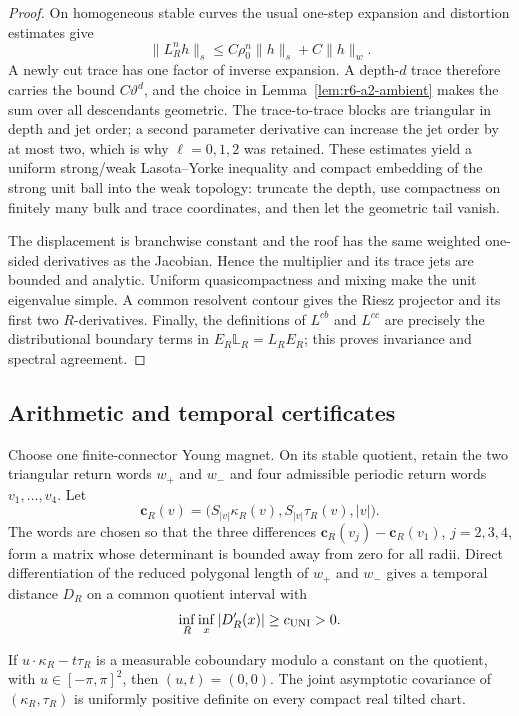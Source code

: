\begin{proof}
On homogeneous stable curves the usual one-step expansion and distortion
estimates give
\[
\|L_R^nh\|_s\le C\rho_0^n\|h\|_s+C\|h\|_w.
\]
A newly cut trace has one factor of inverse expansion.  A depth-\(d\) trace
therefore carries the bound \(C\vartheta^d\), and the choice in
Lemma~\ref{lem:r6-a2-ambient} makes the sum over all descendants geometric.
The trace-to-trace blocks are triangular in depth and jet order; a second
parameter derivative can increase the jet order by at most two, which is why
\(\ell=0,1,2\) was retained.  These estimates yield a uniform strong/weak
Lasota--Yorke inequality and compact embedding of the strong unit ball into
the weak topology: truncate the depth, use compactness on finitely many bulk
and trace coordinates, and then let the geometric tail vanish.

The displacement is branchwise constant and the roof has the same weighted
one-sided derivatives as the Jacobian.  Hence the multiplier and its trace
jets are bounded and analytic.  Uniform quasicompactness and mixing make the
unit eigenvalue simple.  A common resolvent contour gives the Riesz projector
and its first two \(R\)-derivatives.  Finally, the definitions of
\(L^{cb}\) and \(L^{cc}\) are precisely the distributional boundary terms in
\(E_R\mathbb L_R=L_RE_R\); this proves invariance and spectral agreement.
\end{proof}

\subsection{Arithmetic and temporal certificates}

Choose one finite-connector Young magnet.  On its stable quotient, retain the
two triangular return words \(w_+\) and \(w_-\) and four admissible periodic
return words \(v_1,\ldots,v_4\).  Let
\[
\mathbf c_R(v)=\bigl(S_{|v|}\kappa_R(v),S_{|v|}\tau_R(v),|v|\bigr).
\]
The words are chosen so that the three differences
\(\mathbf c_R(v_j)-\mathbf c_R(v_1)\), \(j=2,3,4\), form a matrix whose
determinant is bounded away from zero for all radii.  Direct differentiation
of the reduced polygonal length of \(w_+\) and \(w_-\) gives a temporal
distance \(D_R\) on a common quotient interval with
\[
\inf_R\inf_x|D_R'(x)|\ge c_{\rm UNI}>0.
\]

\begin{lemma}
\label{lem:r6-a2-arithmetic}
If
\(u\cdot\kappa_R-t\tau_R\) is a measurable coboundary modulo a constant on
the quotient, with \(u\in[-\pi,\pi]^2\), then \((u,t)=(0,0)\).  The joint
asymptotic covariance of \((\kappa_R,\tau_R)\) is uniformly positive definite
on every compact real tilted chart.
\end{lemma}

